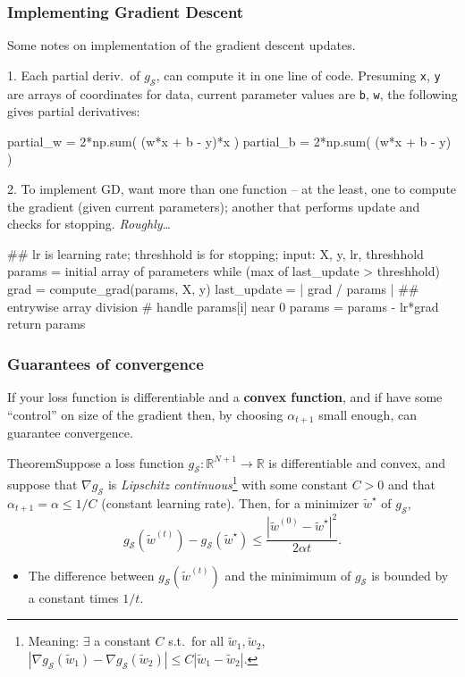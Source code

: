 \documentclass{beamer}
\newenvironment{codeblock}
    {\hfill\begin{beamerboxesrounded}[lower=codecol, width=0.8\textwidth]
    \medskip

    }
    { 
    \end{beamerboxesrounded}\hfill
    }
\begin{document}
\begin{frame}[fragile]
    \frametitle{Implementing Gradient Descent}
    Some notes on implementation of the gradient descent updates.
    
    {\color{mygreen}1.} Each partial deriv.\ of $g_{\mathcal S}$, can compute it in one line of code. \pause Presuming \texttt{x}, \texttt{y} are arrays of coordinates for data, current parameter values are \texttt{b}, \texttt{w}, the following gives partial derivatives:

\begin{codeblock}

\begin{python}
partial_w = 2*np.sum( (w*x + b - y)*x )
partial_b = 2*np.sum( (w*x + b - y) )
\end{python}

\end{codeblock}

    \pause
    {\color{mygreen}2.} To implement GD, want more than one function {--} at the least, one to compute the gradient (given current parameters); another that performs update and checks for stopping. \textit{Roughly}\ldots
\pause

\begin{pseudo}
## lr is learning rate; threshhold is for stopping;
input: X, y, lr, threshhold
params = initial array of parameters
while (max of last_update > threshhold){
    grad = compute_grad(params, X, y)
    last_update = | grad / params | ## entrywise array division
    # handle params[i] near 0
    params = params - lr*grad
}
return params
\end{pseudo}
\end{frame}

\begin{frame}
    \frametitle{Guarantees of convergence}
    If your loss function is differentiable and a \textbf{convex function}, and if have some ``control'' on size of the gradient then, by choosing $\alpha_{t+1}$ small enough, can guarantee convergence. 

    \pause
    \begin{alertblock}{Theorem}Suppose a loss function $g_{\mathcal S}:\mathbb R^{N+1}\to\mathbb R$ is differentiable and convex, and suppose that $\nabla g_{\mathcal S}$ is \textit{Lipschitz continuous}\footnote{Meaning: $\exists$ a constant $C$ s.t.\ for all $\tilde w_1, \tilde w_2$, $|\nabla g_{\mathcal S}(\tilde w_1) - \nabla g_{\mathcal S}(\tilde w_2)| \le C|\tilde w_1 - \tilde w_2|$.} with some constant $C>0$ and that $\alpha_{t+1}=\alpha \le 1/C$ (constant learning rate). Then, for a minimizer $\tilde w^\star$ of $g_{\mathcal S}$, 
            \[g_{\mathcal S}(\tilde w^{(t)}) - g_{\mathcal S}(\tilde w^\star) \le \frac{|\tilde w^{(0)} - \tilde w^\star|^2}{2\alpha t}.\]
    \end{alertblock}
    \pause
    \begin{itemize}
        \item The difference between $g_{\mathcal S}(\tilde w^{(t)})$ and the minimimum of $g_{\mathcal S}$ is bounded by a constant times $1/t$.
    \end{itemize}
\end{frame}
\end{document}
